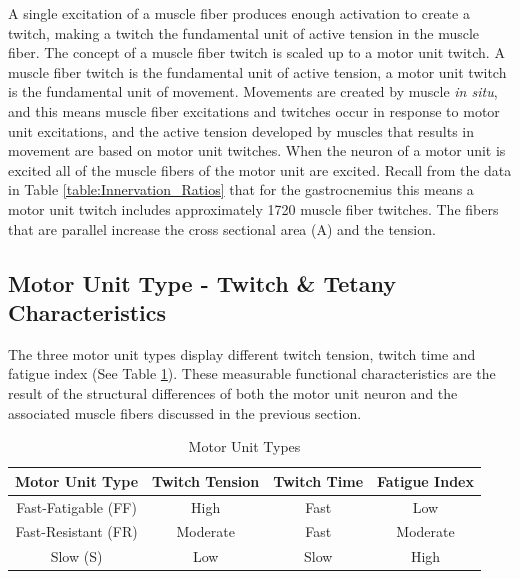 A single excitation of a muscle fiber produces enough activation to create a twitch, making a twitch the fundamental unit of active tension in the muscle fiber. The concept of a muscle fiber twitch is scaled up to a motor unit twitch. A muscle fiber twitch is the fundamental unit of active tension, a motor unit twitch is the fundamental unit of movement.\footnotemark{} Movements are created by muscle \textit{in situ}, and this means muscle fiber excitations and twitches occur in response to motor unit excitations, and the active tension developed by muscles that results in movement are based on motor unit twitches. When the neuron of a motor unit is excited all of the muscle fibers of the motor unit are excited. Recall from the data in Table \ref{table:Innervation_Ratios} that for the gastrocnemius this means a motor unit twitch includes approximately 1720 muscle fiber twitches. The fibers that are parallel increase the cross sectional area (A) and the tension.

\subsection{Motor Unit Type - Twitch \& Tetany Characteristics}

The three motor unit types display different twitch tension, twitch time and fatigue index (See Table \ref{table:Motor_Unit_Types}). These measurable functional characteristics are the result of the structural differences of both the motor unit neuron and the associated muscle fibers discussed in the previous section.

\begin{table}[h!]
\centering
\begin{tabular}{||c c c c||} 
 \hline
 Motor Unit Type & Twitch Tension & Twitch Time & Fatigue Index \\ [0.5ex] 
 \hline\hline
 Fast-Fatigable (FF)  & High & Fast & Low \\ 
 Fast-Resistant (FR)  & Moderate & Fast & Moderate \\
 Slow (S) &  Low & Slow & High \\ [1ex] 
 \hline
\end{tabular}
\caption{Motor Unit Types}
\label{table:Motor_Unit_Types}
\end{table}

